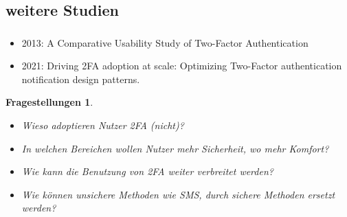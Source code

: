\subsection*{weitere Studien}
\begin{frame}
    \frametitle{\currentsectionname}

    \begin{itemize}
        \item 2013: A Comparative Usability Study of Two-Factor Authentication\cite{de2013}
        \item 2021: Driving 2FA adoption at scale: Optimizing Two-Factor authentication notiﬁcation design patterns.\cite{golla2021}
    \end{itemize}
    \newtheorem{fragen}{Fragestellungen}
    \begin{fragen}
        \begin{itemize}
            \item Wieso adoptieren Nutzer 2FA (nicht)?
            \item In welchen Bereichen wollen Nutzer mehr Sicherheit, wo mehr Komfort?
            \item Wie kann die Benutzung von 2FA weiter verbreitet werden?
            \item Wie können unsichere Methoden wie SMS, durch sichere Methoden ersetzt werden?
        \end{itemize}
    \end{fragen}


\end{frame}
